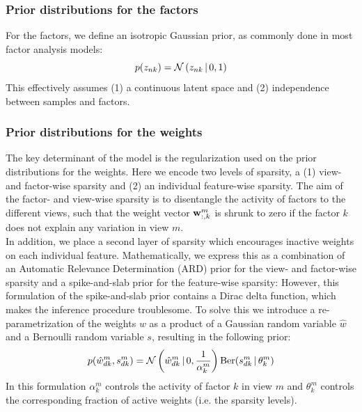 \subsubsection{Prior distributions for the factors}  \label{section:mofa_factors}

For the factors, we define an isotropic Gaussian prior, as commonly done in most factor analysis models:
\begin{equation}
	p(z_{nk}) = \mathcal{N}\left(z_{nk} \,|\, 0,1\right)
\end{equation}
This effectively  assumes (1) a continuous latent space and (2) independence between samples and factors. 

\subsubsection{Prior distributions for the weights}  \label{section:mofa_weights}

The key determinant of the model is the regularization used on the prior distributions for the weights. Here we encode two levels of sparsity, a (1) view- and factor-wise sparsity and (2) an individual feature-wise sparsity. The aim of the factor- and view-wise sparsity is to disentangle the activity of factors to the different views, such that the weight vector ${\bf w}_{:,k}^m$ is shrunk to zero if the factor $k$ does not explain any variation in view $m$. \\
In addition, we place a second layer of sparsity which encourages inactive weights on each individual feature. Mathematically, we express this as a combination of an Automatic Relevance Determination (ARD) prior \cite{Mackay1996} for the view- and factor-wise sparsity and a spike-and-slab prior \cite{Mitchell1988} for the feature-wise sparsity:
However, this formulation of the spike-and-slab prior contains a Dirac delta function, which makes the inference procedure troublesome. To solve this we introduce a re-parametrization of the weights $w$ as a product of a Gaussian random variable $\hat{w}$ and a Bernoulli random variable $s$, \cite{Titsias2011} resulting in the following prior:
\begin{equation}
	p(\hat{w}_{dk}^{m},s_{dk}^{m}) = \mathcal{N}\left(\hat{w}_{dk}^{m} \,|\, 0, \frac{1}{\alpha_k^m}\right)  \text{Ber}(s_{dk}^m \,|\,\theta_k^m)
\end{equation}
In this formulation $\alpha_k^m$ controls the activity of factor $k$ in view $m$ and $\theta_k^m$ controls the corresponding fraction of active weights (i.e. the sparsity levels).\\

